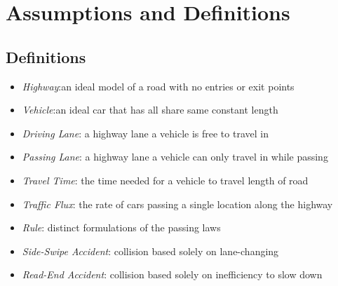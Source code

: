 \documentclass{amsart}
\begin{document}
\section{\bfseries{Assumptions and Definitions}}
	\subsection{Definitions}
		\begin{itemize}
  			\item \textit{Highway}:an ideal model of a road with no entries or exit points
			\item \textit{Vehicle}:an ideal car that has all share same constant length 
			\item \textit{Driving Lane}: a highway lane a vehicle is free to travel in
  			\item \textit{Passing Lane}: a highway lane a vehicle can only travel in while passing
			\item \textit{Travel Time}: the time needed for a vehicle to travel length of road
			\item \textit{Traffic Flux}: the rate of cars passing a single location along the highway
			\item \textit{Rule}: distinct formulations of the passing laws 
			\item \textit{Side-Swipe Accident}: collision based solely on lane-changing
			\item \textit{Read-End Accident}: collision based solely on inefficiency to slow down
			
		\end{itemize}
	
\end{document}
